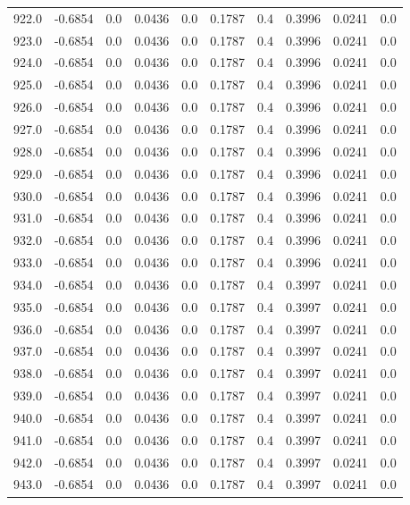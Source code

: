 \begin{longtable}{lrrrrrrrrr}
922.0 & -0.6854 & 0.0 & 0.0436 & 0.0 & 0.1787 & 0.4 & 0.3996 & 0.0241 & 0.0 \\
923.0 & -0.6854 & 0.0 & 0.0436 & 0.0 & 0.1787 & 0.4 & 0.3996 & 0.0241 & 0.0 \\
924.0 & -0.6854 & 0.0 & 0.0436 & 0.0 & 0.1787 & 0.4 & 0.3996 & 0.0241 & 0.0 \\
925.0 & -0.6854 & 0.0 & 0.0436 & 0.0 & 0.1787 & 0.4 & 0.3996 & 0.0241 & 0.0 \\
926.0 & -0.6854 & 0.0 & 0.0436 & 0.0 & 0.1787 & 0.4 & 0.3996 & 0.0241 & 0.0 \\
927.0 & -0.6854 & 0.0 & 0.0436 & 0.0 & 0.1787 & 0.4 & 0.3996 & 0.0241 & 0.0 \\
928.0 & -0.6854 & 0.0 & 0.0436 & 0.0 & 0.1787 & 0.4 & 0.3996 & 0.0241 & 0.0 \\
929.0 & -0.6854 & 0.0 & 0.0436 & 0.0 & 0.1787 & 0.4 & 0.3996 & 0.0241 & 0.0 \\
930.0 & -0.6854 & 0.0 & 0.0436 & 0.0 & 0.1787 & 0.4 & 0.3996 & 0.0241 & 0.0 \\
931.0 & -0.6854 & 0.0 & 0.0436 & 0.0 & 0.1787 & 0.4 & 0.3996 & 0.0241 & 0.0 \\
932.0 & -0.6854 & 0.0 & 0.0436 & 0.0 & 0.1787 & 0.4 & 0.3996 & 0.0241 & 0.0 \\
933.0 & -0.6854 & 0.0 & 0.0436 & 0.0 & 0.1787 & 0.4 & 0.3996 & 0.0241 & 0.0 \\
934.0 & -0.6854 & 0.0 & 0.0436 & 0.0 & 0.1787 & 0.4 & 0.3997 & 0.0241 & 0.0 \\
935.0 & -0.6854 & 0.0 & 0.0436 & 0.0 & 0.1787 & 0.4 & 0.3997 & 0.0241 & 0.0 \\
936.0 & -0.6854 & 0.0 & 0.0436 & 0.0 & 0.1787 & 0.4 & 0.3997 & 0.0241 & 0.0 \\
937.0 & -0.6854 & 0.0 & 0.0436 & 0.0 & 0.1787 & 0.4 & 0.3997 & 0.0241 & 0.0 \\
938.0 & -0.6854 & 0.0 & 0.0436 & 0.0 & 0.1787 & 0.4 & 0.3997 & 0.0241 & 0.0 \\
939.0 & -0.6854 & 0.0 & 0.0436 & 0.0 & 0.1787 & 0.4 & 0.3997 & 0.0241 & 0.0 \\
940.0 & -0.6854 & 0.0 & 0.0436 & 0.0 & 0.1787 & 0.4 & 0.3997 & 0.0241 & 0.0 \\
941.0 & -0.6854 & 0.0 & 0.0436 & 0.0 & 0.1787 & 0.4 & 0.3997 & 0.0241 & 0.0 \\
942.0 & -0.6854 & 0.0 & 0.0436 & 0.0 & 0.1787 & 0.4 & 0.3997 & 0.0241 & 0.0 \\
943.0 & -0.6854 & 0.0 & 0.0436 & 0.0 & 0.1787 & 0.4 & 0.3997 & 0.0241 & 0.0 \\

\end{longtable}
